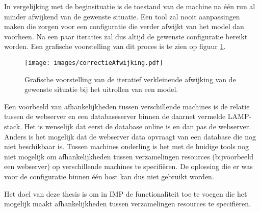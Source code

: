 In vergelijking met de beginsituatie is de toestand van de machine na \'e\'en run al minder afwijkend van de gewenste situatie.
Een tool zal nooit aanpassingen maken die zorgen voor een configuratie die verder afwijkt van het model dan voorheen.
Na een paar iteraties zal dus altijd de gewenste configuratie bereikt worden.
Een grafische voorstelling van dit proces is te zien op figuur \ref{fig:correctieAfwijking}.

\begin{figure}[p]
    \centering
    \texttt{[image: images/correctieAfwijking.pdf]}
    \caption{Grafische voorstelling van de iteratief verkleinende afwijking van de gewenste situatie bij het uitrollen van een model.}
    \label{fig:correctieAfwijking}
\end{figure}

Een voorbeeld van afhankelijkheden tussen verschillende machines is de relatie tussen de webserver en een databaseserver binnen de daarnet
vermelde LAMP-stack.
Het is wenselijk dat eerst de database online is en dan pas de webserver.
Anders is het mogelijk dat de webserver data opvraagt van een database die nog niet beschikbaar is.
Tussen machines onderling is het met de huidige tools nog niet mogelijk om afhankelijkheden tussen verzamelingen resources (bijvoorbeeld een webserver) op verschillende machines te specifi\"eren. 
De oplossing die er was voor de configuratie binnen \'e\'en host kan dus niet gebruikt worden.

Het doel van deze thesis is om in IMP de functionaliteit toe te voegen die het mogelijk maakt afhankelijkheden tussen verzamelingen resources te specifi\"eren.


